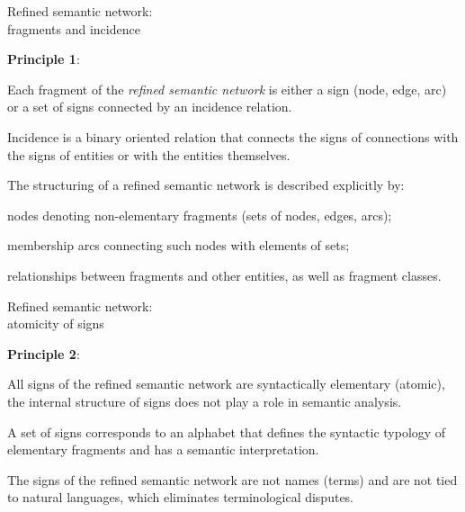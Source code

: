 \begin{frame}{Refined semantic network:\\fragments and incidence}
	\topline
	\justifying
	
	\footnotesize
	
	\textbf{Principle 1}:
	\begin{textitemize}
		\item Each fragment of the \textit{refined semantic network} is either a sign (node, edge, arc) or a set of signs connected by an incidence relation.
		\item Incidence is a binary oriented relation that connects the signs of connections with the signs of entities or with the entities themselves.
	\end{textitemize}
	
	\medskip
	The structuring of a refined semantic network is described explicitly by:
	\begin{textitemize}
		\item nodes denoting non-elementary fragments (sets of nodes, edges, arcs);
		\item membership arcs connecting such nodes with elements of sets;
		\item relationships between fragments and other entities, as well as fragment classes.
	\end{textitemize}
	
\end{frame}


\begin{frame}{Refined semantic network:\\atomicity of signs}
	\topline
	\justifying
	
	\textbf{Principle 2}:
	\begin{textitemize}
		\item All signs of the refined semantic network are syntactically elementary (atomic), the internal structure of signs does not play a role in semantic analysis.
		\item A set of signs corresponds to an alphabet that defines the syntactic typology of elementary fragments and has a semantic interpretation.
	\end{textitemize}
	
	\medskip
	The signs of the refined semantic network are not names (terms) and are not tied to natural languages, which eliminates terminological disputes.
	
\end{frame}


